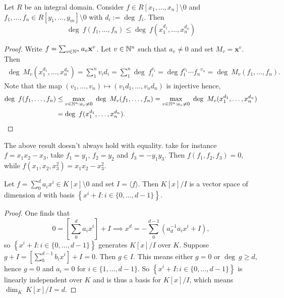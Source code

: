 \begin{lemma}\label{WeightedBoundHasLargerDegreeThenEvaluation}
    Let $R$ be an integral domain. Consider $f\in R[x_1,\dots,x_n]\setminus 0$ and $f_1,\dots,f_n\in R[y_1,\dots,y_m]\setminus 0$ with $d_i:=\deg\ f_i$. Then 
    $$\deg \ f(f_1,\dots,f_n)\leq \deg\ f(x_1^{d_1},\dots,x_n^{d_n})$$
\end{lemma}
\begin{proof}
    Write $f= \sum_{v\in \mathbb{N}^n} a_v\mathbf{x}^v$. Let $v\in \mathbb{N}^n$ such that $a_v\neq 0$ and set $M_v = \mathbf{x}^v$. Then 
    \begin{align*} 
        \deg \ M_v(x_1^{d_1},\dots,x_n^{d_n}) = \sum_1^n v_id_i = \sum_1^n \deg \ f_i^{v_i} = \deg f_1^{v_1}\cdots{f_n}^{v_n} = \deg \ M_v(f_1,\dots,f_n).
    \end{align*}
    Note that the map $(v_1,\dots,v_n)\mapsto (v_1d_1,\dots,v_nd_n)$ is injective hence,
    \begin{align*}
        \deg \ f(f_1,\dots,f_n) &\leq \max_{v\in \N^n : a_v\neq 0}\ \deg \ M_v(f_1,\dots,f_n) = \max_{v\in \N^n :a_v\neq 0}\ \deg\ M_v(x_1^{d_1},\dots,x_n^{d_n})\\ 
        &= \deg \ f(x_1^{d_1},\dots,x_n^{d_n}).
    \end{align*}
\end{proof}
\begin{remark}
    The above result doesn't always hold with equality. take for instance $f=x_1x_2-x_3$, take $f_1=y_1$, $f_2=y_2$ and $f_3=-y_1y_3$. Then $f(f_1,f_2,f_3)=0$, while $f(x_1,x_2,x_3^2)=x_1x_2-x_3^2$.
\end{remark}
\begin{lemma}\label{DimensionOfQuotientSpace}
    Let $f=\sum_0^d a_ix^i \in K[x]\setminus0$ and set $I=\langle f\rangle$. Then $K[x]/I$ is a vector space of dimension $d$ with basis $\left\{x^i+I : i\in\{0,\dots,d-1\}\right\}$.
\end{lemma}
\begin{proof}
    One finds that 
    $$0 = \left[\sum_0^d a_ix^i\right] + I  \implies x^d = -\sum_0^{d-1} \left(a_d^{-1}a_ix^i+I\right),$$
    so $\left\{x^i+I : i\in\{0,\dots,d-1\}\right\}$ generates $K[x]/I$ over $K$. Suppose $g+I=\left[\sum_0^{d-1} b_ix^i\right] + I=0$. Then $g\in I$. This means either $g=0$ or $\deg \ g \geq d$, hence $g=0$ and $a_i = 0$ for $i\in\{1,\dots,d-1\}$. So $\left\{x^i+I : i\in\{0,\dots,d-1\}\right\}$ is linearly independent over $K$ and is thus a basis for $K[x]/I$, which means $\dim_K \ K[x]/I = d$.
\end{proof}
